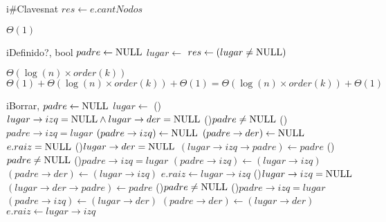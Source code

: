\begin{Algoritmos}
  \begin{algoritmo}{i\#Claves}{}{nat}
    $res \gets e.cantNodos$ 
  \end{algoritmo}
  \datosAlgoritmo{} %
  {} %
  {} %
  {$\Theta(1)$} %
  {} %

  \begin{algoritmo}{iDefinido?}{, }{bool}
     $padre \gets \textrm{NULL}$ 
     $lugar \gets$  
    $res \gets (lugar \neq \textrm{NULL})$ 
  \end{algoritmo}
  \datosAlgoritmo{} %
  {} %
  {} %
  {$\Theta(\log(n) \times order(k))$} %
  {$\Theta(1) + \Theta(\log(n) \times order(k)) + \Theta(1) = \Theta(\log(n) \times order(k)) + \Theta(1)$} %

  \begin{algoritmo}{iBorrar}{, }{}
     $padre \gets \textrm{NULL}$ 
     $lugar \gets$  
    \uIf(){$lugar \to izq = \textrm{NULL} \land lugar \to der = \textrm{NULL}$}{
      \eIf(){$padre \neq \textrm{NULL}$}{
        \eIf(){$padre \to izq = lugar$}{
          $(padre \to izq) \gets \textrm{NULL}$ 
        }{
          $(padre \to der) \gets \textrm{NULL}$ 
        }
         
      }{
        $e.raiz = \textrm{NULL}$ 
      }
    }\uElseIf(){$lugar \to der = \textrm{NULL}$}{
      $(lugar \to izq \to padre) \gets padre$ 
      \eIf(){$padre \neq \textrm{NULL}$}{
        \eIf(){$padre \to izq = lugar$}{
          $(padre \to izq) \gets (lugar \to izq)$ 
        }{
          $(padre \to der) \gets (lugar \to izq)$ 
        }
         
      }{
        $e.raiz \gets lugar \to izq$ 
      }
    }\uElseIf(){$lugar \to izq = \textrm{NULL}$}{
      $(lugar \to der \to padre) \gets padre$ 
      \eIf(){$padre \neq \textrm{NULL}$}{
        \eIf(){$padre \to izq = lugar$}{
          $(padre \to izq) \gets (lugar \to der)$ 
        }{
          $(padre \to der) \gets (lugar \to der)$ 
        }
         
      }{
        $e.raiz \gets lugar \to izq$ 
      }
    }
  \end{algoritmo}


\end{Algoritmos}
